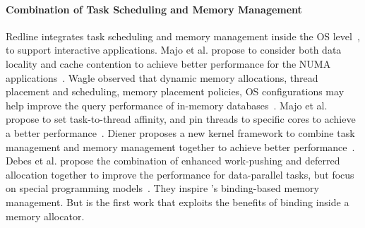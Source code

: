 \paragraph{Combination of Task Scheduling and Memory Management} Redline integrates task scheduling and memory management inside the OS level~\cite{Redline}, to support interactive applications. 
Majo et al. propose to consider both data locality and cache contention to achieve better performance for the NUMA applications~\cite{Majo:2011:MMN:1993478.1993481}. Wagle observed that dynamic memory allocations, thread placement and scheduling, memory placement policies, OS configurations may help improve the query performance of in-memory databases~\cite{wagle2015numa}.  Majo et al. propose to set task-to-thread affinity, and pin threads to specific cores to achieve a better performance~\cite{Majo:2015:LPC:2688500.2688509}. Diener proposes a new kernel framework to combine task management and memory management together to achieve better performance~\cite{diener2015automatic}. 
Debes et al. propose the combination of enhanced work-pushing and deferred allocation together to improve the performance for data-parallel tasks, but focus on special programming models~\cite{DBLP:conf/IEEEpact/DrebesPH0D16}. They inspire \NM{}'s binding-based memory management. But \NM{} is the first work that exploits the benefits of binding inside a memory allocator. 

